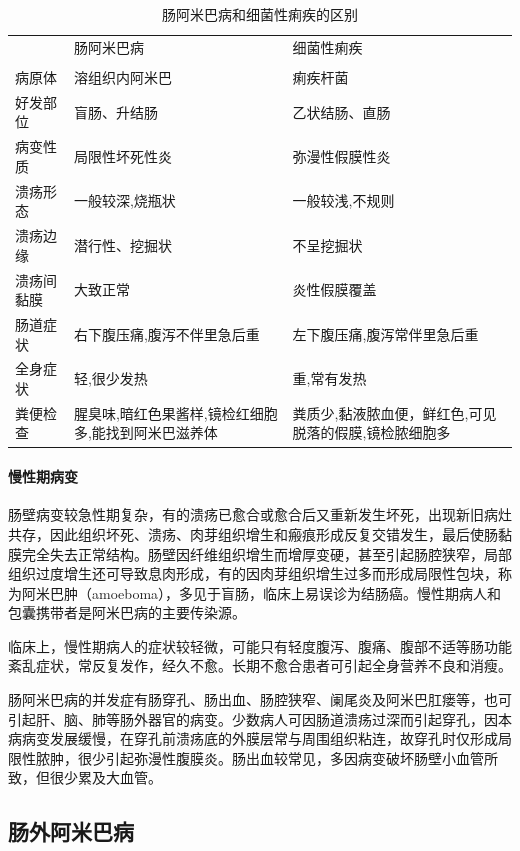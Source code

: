 \begin{table}[ht]
	\caption{肠阿米巴病和细菌性痢疾的区别}
	\label{tab15-1}
	\centering
	\begin{tabular}{lp{5cm}p{5cm}}
	\toprule
	&肠阿米巴病&细菌性痢疾\\\\
	\midrule
	病原体&溶组织内阿米巴&痢疾杆菌\\
好发部位 & 盲肠、升结肠&乙状结肠、直肠\\
病变性质&局限性坏死性炎&弥漫性假膜性炎\\
溃疡形态&一般较深,烧瓶状&一般较浅,不规则\\
溃疡边缘&潜行性、挖掘状&不呈挖掘状\\
溃疡间黏膜&大致正常&炎性假膜覆盖\\
肠道症状 &右下腹压痛,腹泻不伴里急后重&左下腹压痛,腹泻常伴里急后重\\
全身症状&轻,很少发热 &重,常有发热\\
粪便检查&腥臭味,暗红色果酱样,镜检红细胞多,能找到阿米巴滋养体&粪质少,黏液脓血便，鲜红色,可见脱落的假膜,镜检脓细胞多\\
	\bottomrule
	\end{tabular}
\end{table}


\paragraph{慢性期病变}
肠壁病变较急性期复杂，有的溃疡已愈合或愈合后又重新发生坏死，出现新旧病灶共存，因此组织坏死、溃疡、肉芽组织增生和瘢痕形成反复交错发生，最后使肠黏膜完全失去正常结构。肠壁因纤维组织增生而增厚变硬，甚至引起肠腔狭窄，局部组织过度增生还可导致息肉形成，有的因肉芽组织增生过多而形成局限性包块，称为阿米巴肿（amoeboma），多见于盲肠，临床上易误诊为结肠癌。慢性期病人和包囊携带者是阿米巴病的主要传染源。

临床上，慢性期病人的症状较轻微，可能只有轻度腹泻、腹痛、腹部不适等肠功能紊乱症状，常反复发作，经久不愈。长期不愈合患者可引起全身营养不良和消瘦。

肠阿米巴病的并发症有肠穿孔、肠出血、肠腔狭窄、阑尾炎及阿米巴肛瘘等，也可引起肝、脑、肺等肠外器官的病变。少数病人可因肠道溃疡过深而引起穿孔，因本病病变发展缓慢，在穿孔前溃疡底的外膜层常与周围组织粘连，故穿孔时仅形成局限性脓肿，很少引起弥漫性腹膜炎。肠出血较常见，多因病变破坏肠壁小血管所致，但很少累及大血管。

\subsection{肠外阿米巴病}

